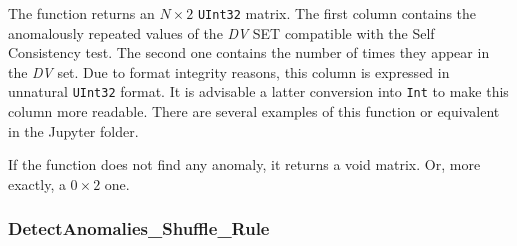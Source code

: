 \begin{itemize}
\begin{itemize}
	\end{itemize}
	
	The function returns an \(N\times 2\) \texttt{UInt32} matrix. The first column contains the anomalously repeated values of the \textit{DV} SET compatible with the Self Consistency test. The second one contains the number of times they appear in the \textit{DV} set. Due to format integrity reasons, this column is expressed in unnatural \texttt{UInt32} format. It is advisable a latter conversion into \texttt{Int} to make this column more readable. There are several examples of this function or equivalent in the Jupyter folder.
	
	If the function does not find any anomaly, it returns a void matrix.  Or, more exactly, a \(0\times 2\) one.
\end{itemize}
%
\subsubsection*{DetectAnomalies\_Shuffle\_Rule}\label{Fun:DetectAnomaliesShuffleRule}
